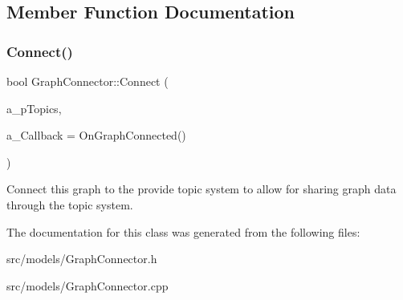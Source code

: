 \subsection{Member Function Documentation}
\mbox{\label{class_graph_connector_aa6bd5d8802483cf784c2b81177f29c85}} 
\subsubsection{\texorpdfstring{Connect()}{Connect()}}
{\footnotesize\ttfamily bool Graph\+Connector\+::\+Connect (\begin{DoxyParamCaption}\item[{\hyperlink{class_i_topics}{I\+Topics} $\ast$}]{a\+\_\+p\+Topics,  }\item[{On\+Graph\+Connected}]{a\+\_\+\+Callback = {\ttfamily OnGraphConnected()} }\end{DoxyParamCaption})}

Connect this graph to the provide topic system to allow for sharing graph data through the topic system. 

The documentation for this class was generated from the following files\+:\begin{DoxyCompactItemize}
\item 
src/models/Graph\+Connector.\+h\item 
src/models/Graph\+Connector.\+cpp\end{DoxyCompactItemize}
